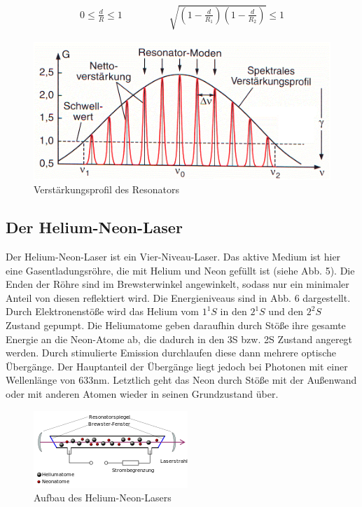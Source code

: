 \begin{align}
0\leq \frac{d}{R}\leq 1 \hspace{2cm} \sqrt{\left(1-\frac{d}{R_1}\right)\left(1-\frac{d}{R_2}\right)}\leq 1
\end{align}
 
\begin{figure}[here]
\centering
\includegraphics[scale=0.4]{img/HNL6}
\caption{Verstärkungsprofil des Resonators}
\begin{center}
\end{center}
\end{figure}

\subsection{Der Helium-Neon-Laser}
Der Helium-Neon-Laser ist ein Vier-Niveau-Laser. Das aktive Medium ist  hier eine Gasentladungsröhre, die mit Helium und Neon gefüllt ist (siehe  Abb. 5). Die Enden der Röhre sind im Brewsterwinkel angewinkelt, sodass nur ein minimaler Anteil von diesen reflektiert wird. Die Energieniveaus sind in Abb. 6 dargestellt. Durch Elektronenstöße wird das Helium vom $1^1S$ in den $2^1S$ und den $2^2S$ Zustand gepumpt. Die Heliumatome geben daraufhin durch Stöße ihre gesamte Energie an die Neon-Atome ab, die dadurch in den 3S bzw. 2S Zustand angeregt werden. Durch stimulierte Emission durchlaufen diese dann mehrere optische Übergänge. Der Hauptanteil der Übergänge liegt jedoch bei Photonen mit einer Wellenlänge von 633nm. Letztlich geht das Neon durch Stöße mit der Außenwand oder mit anderen Atomen wieder in seinen Grundzustand über.

\begin{figure}[here]
\centering
\includegraphics[scale=0.7]{img/HNL7}
\caption{Aufbau des Helium-Neon-Lasers}
\begin{center}
\end{center}
\end{figure}

